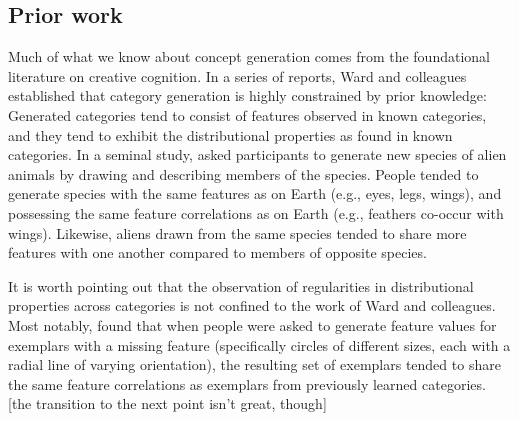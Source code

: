 \documentclass[12pt]{article}
\newcommand\sxlnote[1]{\todo[inline, backgroundcolor = cyan]{\textbf{SXL}: #1}}
\begin{document}
\begin{flushleft}
\section{Prior work}

Much of what we know about concept generation comes from the foundational
literature on creative cognition. In a series of reports, Ward and colleagues
\citep{ward1995s,ward1994structured,marsh1999inadvertent,ward2002role,smith1993constraining}
established that category generation is highly constrained by prior knowledge:
Generated categories tend to consist of features observed in known categories,
and they tend to exhibit the distributional properties as found in known
categories. In a seminal study, \cite{ward1994structured} asked participants to
generate new species of alien animals by drawing and describing members of the
species. People tended to generate species with the same features as on Earth
(e.g., eyes, legs, wings), and possessing the same feature correlations as on
Earth (e.g., feathers co-occur with wings). Likewise, aliens drawn from the same
species tended to share more features with one another compared to members of
opposite species. 

\sxlnote{Added thomas98 description here} It is worth pointing out that the
observation of regularities in distributional properties across categories is
not confined to the work of Ward and colleagues. Most notably, \citet{thomas98}
found that when people were asked to generate feature values for exemplars with
a missing feature (specifically circles of different sizes, each with a radial
line of varying orientation), the resulting set of exemplars tended to share the
same feature correlations as exemplars from previously learned categories. [the
transition to the next point isn't great, though]


\end{flushleft}
\end{document}
